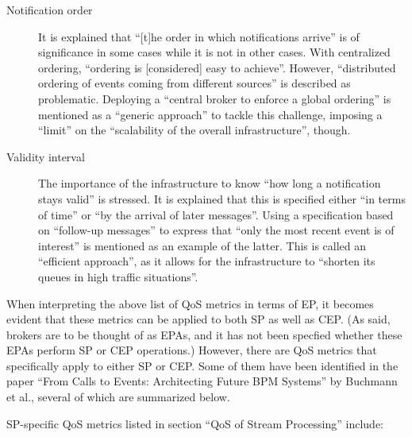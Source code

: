 \documentclass[article, 10pt, type=bsc, colorback, accentcolor=tud8b, parskip=half, bibliography=totocnumbered]{tudthesis}
\begin{document}
\begin{description}
\item[Notification order]
It is explained that ``[t]he order in which notifications arrive'' is of significance in some cases while it is not in other cases.
With centralized ordering, ``ordering is [considered] easy to achieve''.
However, ``distributed ordering of events coming from different sources'' is described as problematic.
Deploying a ``central broker to enforce a global ordering'' is mentioned as a ``generic approach'' to tackle this challenge, imposing a ``limit'' on the ``scalability of the overall infrastructure'', though.
\item[Validity interval]
The importance of the infrastructure to know ``how long a notification stays valid'' is stressed.
It is explained that this is specified either ``in terms of time'' or ``by the arrival of later messages''.
Using a specification based on ``follow-up messages'' to express that ``only the most recent event is of interest'' is mentioned as an example of the latter.
This is called an ``efficient approach'', as it allows for the infrastructure to ``shorten its queues in high traffic situations''.
\end{description}

When interpreting the above list of QoS metrics in terms of EP, it becomes evident that these metrics can be applied to both SP as well as CEP.
(As said, brokers are to be thought of as EPAs, and it has not been specfied whether these EPAs perform SP or CEP operations.)
However, there are QoS metrics that specifically apply to either SP or CEP.
Some of them have been identified in the paper ``From Calls to Events: Architecting Future BPM Systems'' \cite{Buchmann:2012:CEA:2413516.2413519} by Buchmann et al., several of which are summarized below.

SP-specific QoS metrics listed in section ``QoS of Stream Processing'' \cite{Buchmann:2012:CEA:2413516.2413519} include:
\end{document}
